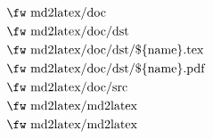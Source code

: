 \begin{align} %

& \text{{\fw md2latex/doc}} \\
& \text{{\fw md2latex/doc/dst}} \\
& \text{{\fw md2latex/doc/dst/\$\{name\}.tex}} \\
& \text{{\fw md2latex/doc/dst/\$\{name\}.pdf}} \\
& \text{{\fw md2latex/doc/src}} \\
&\text{{\fw md2latex/md2latex}} \\
&\text{{\fw md2latex/md2latex}}
\end{align}